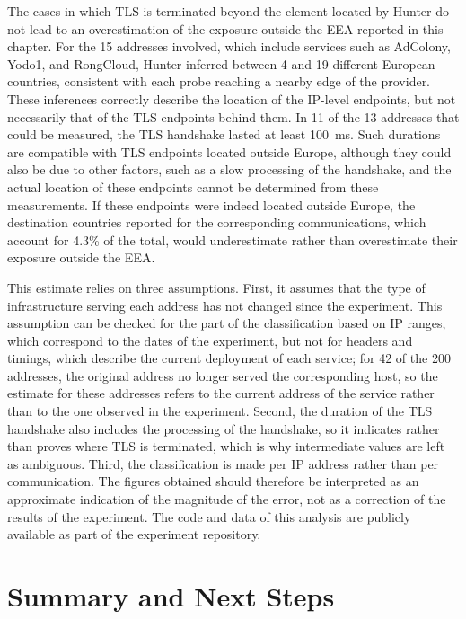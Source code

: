 The cases in which TLS is terminated beyond the element located by Hunter do not lead to an overestimation of the exposure outside the EEA reported in this chapter. For the 15 addresses involved, which include services such as AdColony, Yodo1, and RongCloud, Hunter inferred between 4 and 19 different European countries, consistent with each probe reaching a nearby edge of the provider. These inferences correctly describe the location of the IP-level endpoints, but not necessarily that of the TLS endpoints behind them. In 11 of the 13 addresses that could be measured, the TLS handshake lasted at least 100~ms. Such durations are compatible with TLS endpoints located outside Europe, although they could also be due to other factors, such as a slow processing of the handshake, and the actual location of these endpoints cannot be determined from these measurements. If these endpoints were indeed located outside Europe, the destination countries reported for the corresponding communications, which account for 4.3\% of the total, would underestimate rather than overestimate their exposure outside the EEA.

This estimate relies on three assumptions. First, it assumes that the type of infrastructure serving each address has not changed since the experiment. This assumption can be checked for the part of the classification based on IP ranges, which correspond to the dates of the experiment, but not for headers and timings, which describe the current deployment of each service; for 42 of the 200 addresses, the original address no longer served the corresponding host, so the estimate for these addresses refers to the current address of the service rather than to the one observed in the experiment. Second, the duration of the TLS handshake also includes the processing of the handshake, so it indicates rather than proves where TLS is terminated, which is why intermediate values are left as ambiguous. Third, the classification is made per IP address rather than per communication. The figures obtained should therefore be interpreted as an approximate indication of the magnitude of the error, not as a correction of the results of the experiment. The code and data of this analysis are publicly available as part of the experiment repository.

\section{Summary and Next Steps}
\label{sc:anycast_experiments_summary}

